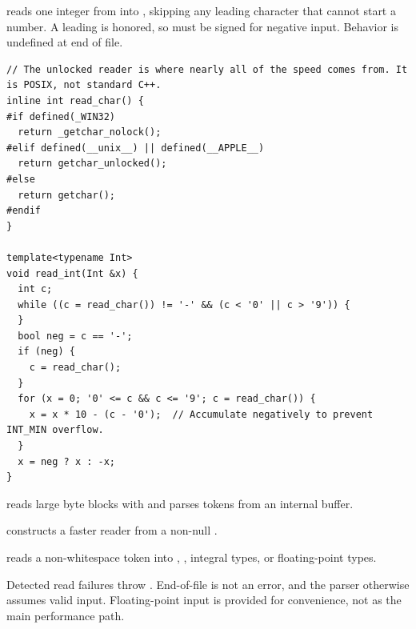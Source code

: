 \begin{compactitem}
  \item {} reads one integer from  into , skipping any leading character that cannot start a number. A leading \inlinecode{-} is honored, so  must be signed for negative input. Behavior is undefined at end of file.
\end{compactitem}

\begin{lstlisting}[style=cpp]
// The unlocked reader is where nearly all of the speed comes from. It is POSIX, not standard C++.
inline int read_char() {
#if defined(_WIN32)
  return _getchar_nolock();
#elif defined(__unix__) || defined(__APPLE__)
  return getchar_unlocked();
#else
  return getchar();
#endif
}

template<typename Int>
void read_int(Int &x) {
  int c;
  while ((c = read_char()) != '-' && (c < '0' || c > '9')) {
  }
  bool neg = c == '-';
  if (neg) {
    c = read_char();
  }
  for (x = 0; '0' <= c && c <= '9'; c = read_char()) {
    x = x * 10 - (c - '0');  // Accumulate negatively to prevent INT_MIN overflow.
  }
  x = neg ? x : -x;
}
\end{lstlisting}
 reads large byte blocks with  and parses tokens from an internal buffer.

\begin{compactitem}
  \item {} constructs a faster reader from a non-null .
  \item {} reads a non-whitespace token into , , integral types, or floating-point types.
\end{compactitem}

Detected read failures throw . End-of-file is not an error, and the parser otherwise assumes valid input. Floating-point input is provided for convenience, not as the main performance path.

